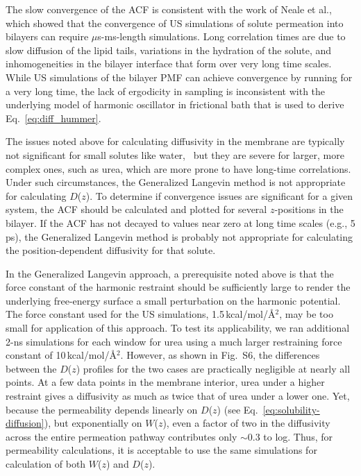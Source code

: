 The slow convergence of the ACF is consistent with the work of Neale et al.,~\cite{Neale2011}
which showed that the convergence of US simulations of solute permeation
into bilayers can require $\mu$s-ms-length simulations. Long correlation times are
due to slow diffusion of the lipid tails, variations in the hydration of the solute, and
inhomogeneities in the bilayer interface that form over very long time scales.~\cite{Neale2013}
While US simulations of the bilayer PMF can achieve convergence by running for a very long time, the
lack of ergodicity in sampling is inconsistent with the underlying model of harmonic
oscillator in frictional bath that is used to derive Eq.~\ref{eq:diff_hummer}.

The issues noted above for calculating diffusivity in the membrane are typically not
significant for small solutes like water,~\cite{Riahi2014,Issack2015}
but they are severe for larger, more complex ones, such as urea, which are more prone to
have long-time correlations. Under such circumstances, the Generalized Langevin method is not appropriate for
calculating $D$($z$).  To determine if convergence issues are significant for a given
system, the ACF should be calculated and plotted for several $z$-positions in the bilayer. If the ACF
has not decayed to values near zero at long time scales (e.g., 5 ps), the Generalized Langevin
method is probably not appropriate for calculating the position-dependent diffusivity for that solute.

In the Generalized Langevin approach, a prerequisite noted above is that the force constant
of the harmonic restraint should be sufficiently large to render the underlying free-energy
surface a small perturbation on the harmonic potential.  The force constant used for the US
simulations, 1.5\,kcal/mol/\AA$^2$, may be
too small for application of this approach.  To test its applicability, we ran additional
2-ns simulations for each window for urea using a much larger restraining force constant
of 10\,kcal/mol/\AA$^2$.  However, as shown in Fig.~S6, the differences
between the $D$($z$) profiles for the two cases are practically negligible at nearly all
points.  At a few data points in the membrane interior, urea under a higher restraint
gives a diffusivity as much as twice that of urea under a lower one.  Yet, because
the permeability depends linearly on $D$($z$) (see Eq.~\ref{eq:solubility-diffusion}), but
exponentially on $W$($z$), even a factor of two in the diffusivity across the entire permeation
pathway contributes only $\sim$0.3 to log\perm.  Thus, for permeability calculations, it is
acceptable to use the same simulations for calculation of both $W$($z$) and $D$($z$).

